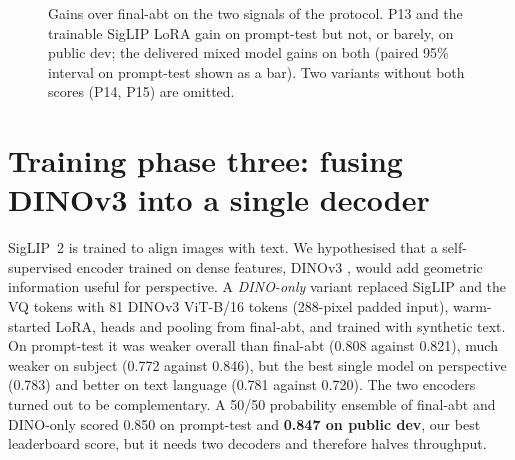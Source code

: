 \documentclass[11pt]{article}
\begin{document}
\begin{figure}[ht]
\centering
{}
\caption{Gains over final-abt on the two signals of the protocol. P13 and the trainable SigLIP LoRA gain on prompt-test but not, or barely, on public dev; the delivered mixed model gains on both (paired 95\% interval on prompt-test shown as a bar). Two variants without both scores (P14, P15) are omitted.}
\label{fig:signals}
\end{figure}

\section{Training phase three: fusing DINOv3 into a single decoder}
\label{sec:phase3}
SigLIP~2 is trained to align images with text. We hypothesised that a self-supervised encoder trained on dense features, DINOv3 \cite{dinov3}, would add geometric information useful for perspective. A \emph{DINO-only} variant replaced SigLIP and the VQ tokens with 81 DINOv3 ViT-B/16 tokens (288-pixel padded input), warm-started LoRA, heads and pooling from final-abt, and trained with synthetic text. On prompt-test it was weaker overall than final-abt (0.808 against 0.821), much weaker on subject (0.772 against 0.846), but the best single model on perspective (0.783) and better on text language (0.781 against 0.720). The two encoders turned out to be complementary. A 50/50 probability ensemble of final-abt and DINO-only scored 0.850 on prompt-test and \textbf{0.847 on public dev}, our best leaderboard score, but it needs two decoders and therefore halves throughput.
\end{document}
